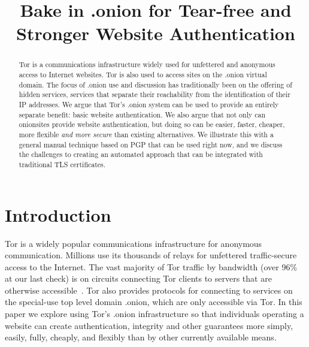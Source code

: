 \documentclass[10pt, conference, compsocconf]{styles/IEEEtran}
\title{Bake in .onion for Tear-free and Stronger Website Authentication}
\author{
\IEEEauthorblockN{Paul Syverson}
\IEEEauthorblockA{U.S. Naval Research Laboratory\\
paul.syverson@nrl.navy.mil}
\and
\IEEEauthorblockN{Griffin Boyce}
\IEEEauthorblockA{Berkman Center for Internet and Society at Harvard University\\
griffin@cryptolab.net}
}
\begin{document}
\maketitle

\begin{abstract}
  Tor is a communications infrastructure widely used for unfettered
  and anonymous access to Internet websites. Tor is also used to
  access sites on the .onion virtual domain.  The focus of .onion use
  and discussion has traditionally been on the offering of hidden
  services, services that separate their reachability from the
  identification of their IP addresses. We argue that Tor's .onion
  system can be used to provide an entirely separate benefit: basic
  website authentication. We also argue that not only can onionsites
  provide website authentication, but doing so can be easier, faster,
  cheaper, more flexible \emph{and more secure} than existing alternatives.
  We illustrate this with a general manual technique based on PGP
  that can be used right now, and we discuss the challenges to
  creating an automated approach that can be integrated with
  traditional TLS certificates.
\end{abstract}

% 
% 
% 
% 
% 
% 
% 
% 
% 
% 
% 

\section{Introduction}
Tor is a widely popular communications infrastructure for anonymous
communication. Millions use its thousands of relays for unfettered
traffic-secure access to the Internet. The vast majority of Tor
traffic by bandwidth (over 96\% at our last check) is on circuits
connecting Tor clients to servers that are otherwise
accessible~\cite{hs-stats-report-2015}. Tor
also provides protocols for connecting to services on the
special-use top level domain .onion, which are only accessible via Tor.
In this paper we explore using Tor's .onion infrastructure so that
individuals operating a website can create authentication, integrity
and other guarantees more simply, easily, fully, cheaply, and flexibly
than by other currently available means.
\end{document}
